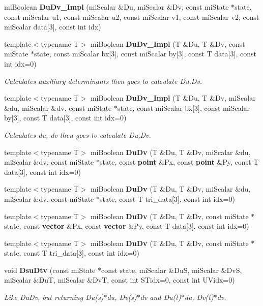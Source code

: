 \begin{CompactItemize}
\item 
mi\-Boolean {\bf Du\-Dv\_\-Impl} (mi\-Scalar \&Du, mi\-Scalar \&Dv, const mi\-State $\ast$state, const mi\-Scalar u1, const mi\-Scalar u2, const mi\-Scalar v1, const mi\-Scalar v2, const mi\-Scalar data[3], const int idx)
\item 
template$<$typename T$>$ mi\-Boolean {\bf Du\-Dv\_\-Impl} (T \&Du, T \&Dv, const mi\-State $\ast$state, const mi\-Scalar bx[3], const mi\-Scalar by[3], const T data[3], const int idx=0)
\begin{CompactList}\small\item\em Calculates auxiliary determinants then goes to calculate Du,Dv. \item\end{CompactList}\item 
template$<$typename T$>$ mi\-Boolean {\bf Du\-Dv\_\-Impl} (T \&Du, T \&Dv, mi\-Scalar \&du, mi\-Scalar \&dv, const mi\-State $\ast$state, const mi\-Scalar bx[3], const mi\-Scalar by[3], const T data[3], const int idx=0)
\begin{CompactList}\small\item\em Calculates du, dv then goes to calculate Du,Dv. \item\end{CompactList}\item 
template$<$typename T$>$ mi\-Boolean {\bf Du\-Dv} (T \&Du, T \&Dv, mi\-Scalar \&du, mi\-Scalar \&dv, const mi\-State $\ast$state, const {\bf point} \&Px, const {\bf point} \&Py, const T data[3], const int idx=0)
\item 
template$<$typename T$>$ mi\-Boolean {\bf Du\-Dv} (T \&Du, T \&Dv, mi\-Scalar \&du, mi\-Scalar \&dv, const mi\-State $\ast$state, const T tri\_\-data[3], const int idx=0)
\item 
template$<$typename T$>$ mi\-Boolean {\bf Du\-Dv} (T \&Du, T \&Dv, const mi\-State $\ast$state, const {\bf vector} \&Px, const {\bf vector} \&Py, const T data[3], const int idx=0)
\item 
template$<$typename T$>$ mi\-Boolean {\bf Du\-Dv} (T \&Du, T \&Dv, const mi\-State $\ast$state, const T tri\_\-data[3], const int idx=0)
\item 
void {\bf Dsu\-Dtv} (const mi\-State $\ast$const state, mi\-Scalar \&Du\-S, mi\-Scalar \&Dv\-S, mi\-Scalar \&Du\-T, mi\-Scalar \&Dv\-T, const int STidx=0, const int UVidx=0)
\begin{CompactList}\small\item\em Like Du\-Dv, but returning Du(s)$\ast$du, Dv(s)$\ast$dv and Du(t)$\ast$du, Dv(t)$\ast$dv. \item\end{CompactList}\item 

\end{CompactItemize}
